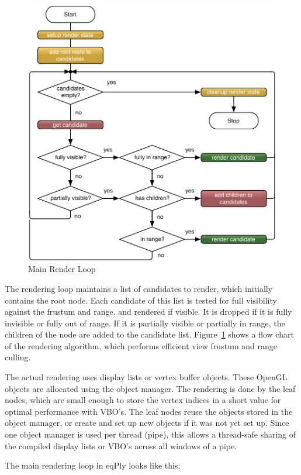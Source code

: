 \documentclass[10pt,a4]{scrartcl}
\newcommand{\fig}[1]{Figure~\ref{#1}}
\begin{document}
\begin{figure}
  \includegraphics[width=.618\textwidth]{images/render.pdf}
  {\caption{\label{fRender}Main Render Loop}}
\end{figure}
The rendering loop maintains a list of candidates to render, which
initially contains the root node. Each candidate of this list is tested
for full visibility against the frustum and range, and rendered if
visible. It is dropped if it is fully invisible or fully out of
range. If it is partially visible or partially in range, the children of
the node are added to the candidate list. \fig{fRender} shows a flow
chart of the rendering algorithm, which performs efficient view frustum
and range culling.

The actual rendering uses display lists or vertex buffer objects. These
OpenGL objects are allocated using the object manager. The rendering is
done by the leaf nodes, which are small enough to store the vertex
indices in a \textsf{short} value for optimal performance with VBO's.
The leaf nodes reuse the objects stored in the object manager, or create
and set up new objects if it was not yet set up. Since one object
manager is used per thread (pipe), this allows a thread-safe sharing of
the compiled display lists or VBO's across all windows of a pipe.

The main rendering loop in \textsf{eqPly} looks like this:
\end{document}
